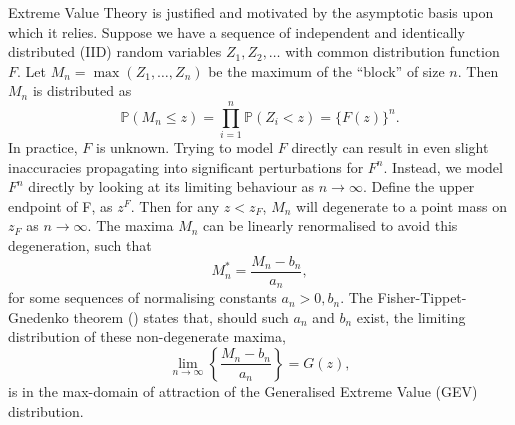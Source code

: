 \documentclass{article}
\numberwithin{equation}{section}
\begin{document}
Extreme Value Theory is justified and motivated by the asymptotic basis upon which it relies.
Suppose we have a sequence of independent and identically distributed (IID) random variables $Z_1, Z_2, \ldots$ with common distribution function $F$. 
Let $M_n = \max(Z_1, \ldots, Z_n)$ be the maximum of the ``block'' of size $n$.
Then $M_n$ is distributed as
\[
  \mathbb{P}(M_n \le z) = \prod_{i = 1}^{n}{\mathbb{P}(Z_i < z)} = \{F(z)\}^n.
\]
In practice, $F$ is unknown.
Trying to model $F$ directly can result in even slight inaccuracies propagating into significant perturbations for $F^n$.
Instead, we model $F^n$ directly by looking at its limiting behaviour as $n \to \infty$.
Define the upper endpoint of F, as $z^F$. %
Then for any $z < z_F$, $M_n$ will degenerate to a point mass on $z_F$ as $n \to \infty$.
The maxima $M_n$ can be linearly renormalised to avoid this degeneration, such that
\[
  M_n^* = \frac{M_n - b_n}{a_n},
\]
for some sequences of normalising constants $a_n > 0, b_n$. 
The Fisher-Tippet-Gnedenko theorem (\cite{Fisher1928, Gnedenko1943}) states that, should such $a_n$ and $b_n$ exist, the limiting distribution of these non-degenerate maxima,
\begin{equation} \label{eq:uni_limiting_dist}
  \lim_{n \to \infty}\left\{\frac{M_n - b_n}{a_n}\right\} = G(z),
\end{equation}
is in the max-domain of attraction of the Generalised Extreme Value (GEV) distribution. %
\end{document}
